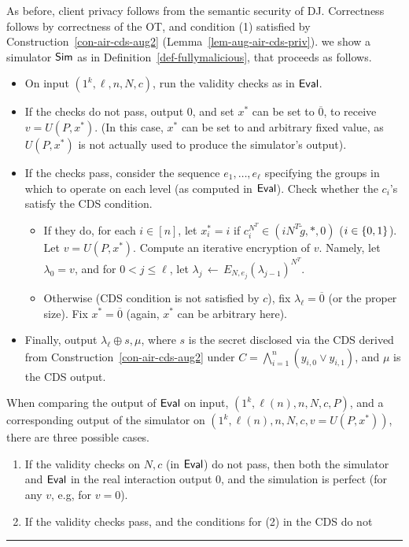 \documentclass[11pt]{article}
\newenvironment{proof}{\noindent {\bf Proof:} \hspace{.677em}}%
                     {\qed}
\newcommand{\qed}{\hspace*{\fill}\rule{0.6em}{0.6em}}
\newcommand{\from}{{\,\leftarrow\,}}
\newcommand{\eval}{{\sf Eval}}
\renewcommand{\sim}{{\sf Sim}}
\newcommand{\encr}[2]{E_{#1}(#2)}
\newcommand{\mathify}[1]{\ifmmode{#1}\else\mbox{$#1$}\fi}
\newcommand{\set}[2][]{\mathify{{\left\{#2\right\}}^{#1}}}
\newcommand{\opbrange}[3][,]{#2#1\ldots#1#3}
\newcommand{\samp}[2]{#1\from #2}
\begin{document}
\begin{proof}
  As before, client privacy follows from the semantic security of DJ.
  Correctness follows by correctness of the OT, and condition (1) satisfied by Construction~\ref{con-air-cds-aug2}
  (Lemma~\ref{lem-aug-air-cds-priv}). 
  we show a simulator $\sim$ as in Definition~\ref{def-fullymalicious}, that proceeds as follows.
  \begin{itemize}
    \item On input $(1^k,\ell,n,N,c)$, run the validity checks as in $\eval$.  
    \item If the checks do not pass, output $0$, and set $x^*$ can be set to $\overline{0}$, to receive $v=U(P,x^*)$.
    (In this case, $x^*$ can be set to and arbitrary fixed value, as $U(P,x^*)$ is not actually used to produce the simulator's output).
    \item If the checks pass, consider the sequence $\opbrange{e_1}{e_{\ell}}$ specifying the groups in which to operate on each level (as computed in $\eval$).
    Check whether the $c_i$'s satisfy the CDS condition. 
    \begin{itemize}
      \item If they do, for each $i\in [n]$, let $x^*_i=i$ if $c^{N^T}_i\in (iN^T\tilde{g},*,0)$ ($i\in\set{0,1}$).
      Let $v=U(P,x^*)$. Compute an iterative encryption of $v$. Namely, let $\lambda_0=v$, and for $0<j\leq \ell$, let $\samp{\lambda_j}{\encr{N,e_j}{\lambda_{j-1}}^{N^T}}$.
      \item Otherwise (CDS condition is not satisfied by $c$), fix $\lambda_\ell=\overline{0}$ (or the proper size). Fix $x^*=\overline{0}$ (again, $x^*$ can be arbitrary here).
    \end{itemize}
    \item Finally, output $\lambda_{\ell}\oplus s,\mu$, where $s$ is the secret disclosed via the CDS derived from Construction~\ref{con-air-cds-aug2} under $C=\bigwedge^n_{i=1}(y_{i,0}\vee y_{i,1})$, and $\mu$ is the CDS output. 
  \end{itemize}
  When comparing the output of $\eval$ on input, $(1^k,\ell(n),n,N,c,P)$, and a corresponding output of the simulator on $(1^k,\ell(n),n,N,c,v=U(P,x^*))$, there are 
  three possible cases.
  \begin{enumerate}
    \item If the validity checks on $N,c$ (in $\eval$) do not pass, then both the simulator and
    $\eval$ in the real interaction output 0, and the simulation is perfect (for any $v$, e.g, for $v=0$).
    \item If the validity checks pass, and the conditions for (2) in the CDS do not

\end{enumerate}
\end{proof}
\end{document}
